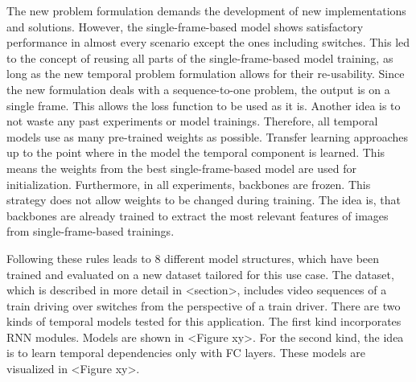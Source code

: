 The new problem formulation demands the development of new implementations and solutions.
However, the single-frame-based model shows satisfactory performance in almost every scenario except the ones including switches.
This led to the concept of reusing all parts of the single-frame-based model training, as long as the new temporal problem formulation allows for their re-usability.
Since the new formulation deals with a sequence-to-one problem, the output is on a single frame. This allows the loss function to be used as it is.
Another idea is to not waste any past experiments or model trainings.
Therefore, all temporal models use as many pre-trained weights as possible.
Transfer learning approaches up to the point where in the model the temporal component is learned.
This means the weights from the best single-frame-based model are used for initialization.
Furthermore, in all experiments, backbones are frozen.
This strategy does not allow weights to be changed during training.
The idea is, that backbones are already trained to extract the most relevant features of images from single-frame-based trainings.

Following these rules leads to 8 different model structures, which have been trained and evaluated on a new dataset tailored for this use case.
The dataset, which is described in more detail in <section>, includes video sequences of a train driving over switches from the perspective of a train driver.
There are two kinds of temporal models tested for this application.
The first kind incorporates \ac{RNN} modules.
Models are shown in <Figure xy>.
For the second kind, the idea is to learn temporal dependencies only with \ac{FC} layers.
These models are visualized in <Figure xy>.

